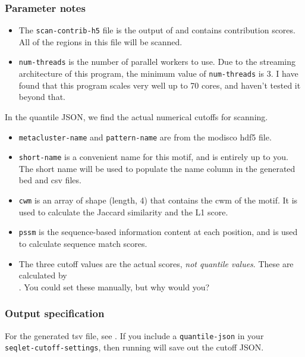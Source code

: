 \documentclass{article}
\begin{document}
\subsubsection{Parameter notes}
\begin{itemize}
    \item The \texttt{scan-contrib-h5} file is the output of
         and contains contribution scores.
        All of the regions in this file will be scanned.
    \item \texttt{num-threads} is the number of parallel workers to use.
        Due to the streaming architecture of this program, the minimum value
        of \texttt{num-threads} is 3.
        I have found that this program scales very well up to 70 cores, and
        haven't tested it beyond that.
\end{itemize}

In the quantile JSON, we find the actual numerical cutoffs for scanning.

\begin{itemize}
    \item \texttt{metacluster-name} and \texttt{pattern-name} are from the
        modisco hdf5 file.
    \item \texttt{short-name} is a convenient name for this motif, and is
        entirely up to you.
        The short name will be used to populate the name column in the generated
        bed and csv files.
    \item \texttt{cwm} is an array of shape (length, 4) that contains the cwm of
        the motif.
        It is used to calculate the Jaccard similarity and the L1 score.
    \item \texttt{pssm} is the sequence-based information content at each
        position, and is used to calculate sequence match scores.
    \item The three cutoff values are the actual scores,
        \emph{not quantile values}.
        These are calculated by \\ .
        You could set these manually, but why would you?
\end{itemize}

\subsubsection{Output specification}
For the generated tsv file, see .
If you include a \texttt{quantile-json} in
your \\ \texttt{seqlet-cutoff-settings}, then running  will
save out the cutoff JSON.
\end{document}
